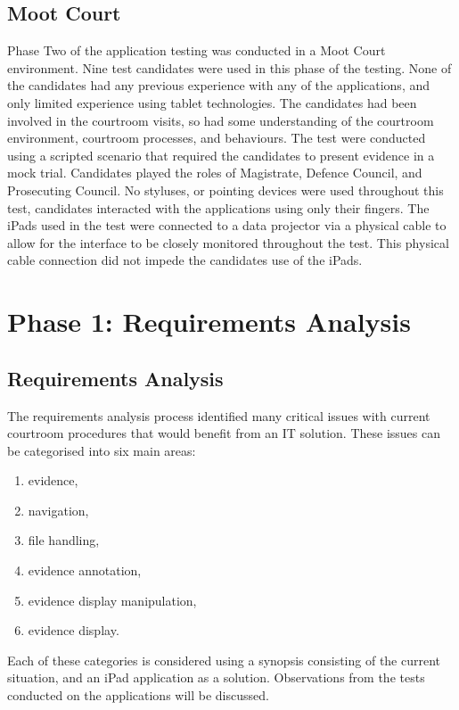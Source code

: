\subsection{Moot Court}
Phase Two of the application testing was conducted in a Moot Court environment. Nine test candidates were used in this phase of the testing. None of the candidates had any previous experience with any of the applications, and only limited experience using tablet technologies. The candidates had been involved in the courtroom visits, so had some understanding of the courtroom environment, courtroom processes, and behaviours. The test were conducted using a scripted scenario that required the candidates to present evidence in a mock trial. Candidates played the roles of Magistrate, Defence Council, and Prosecuting Council. No styluses, or pointing devices were used throughout this test, candidates interacted with the applications using only their fingers. The iPads used in the test were connected to a data projector via a physical cable to allow for the interface to be closely monitored throughout the test. This physical cable connection did not impede the candidates use of the iPads.

\section{Phase 1: Requirements Analysis}
\subsection{Requirements Analysis}
The requirements analysis process identified many critical issues with current courtroom procedures that would benefit from an IT solution. These issues can be categorised into six main areas:
 
\begin{enumerate}
\item evidence, 
\item navigation,
\item file handling,
\item evidence annotation,
\item evidence display manipulation,
\item evidence display.
\end{enumerate}
Each of these categories is considered using a synopsis consisting of the current situation, and an iPad application as a solution. Observations from the tests conducted on the applications will be discussed.
 

